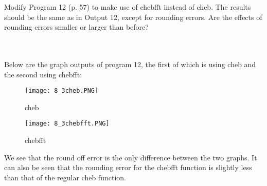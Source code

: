 Modify Program 12 (p. 57) to make use of chebfft instead of cheb. The results should be the same as in
Output 12, except for rounding errors. Are the effects of rounding errors smaller or larger than
before?\\\\

\begin{solution}\renewcommand{\qedsymbol}{}\ \\ 
    Below are the graph outputs of program 12, the first of which is using cheb and the second using
    chebfft:

    \begin{figure}[htp]
        \centering
        \texttt{[image: 8\_3cheb.PNG]}
        \caption{cheb}
    \end{figure}
    \begin{figure}[htp]
        \centering
        \texttt{[image: 8\_3chebfft.PNG]}
        \caption{chebfft}
    \end{figure}

    We see that the round off error is the only difference between the two graphs. It can also be seen
    that the rounding error for the chebfft function is slightly less than that of the regular cheb
    function.

\end{solution}

\newpage

\newpage